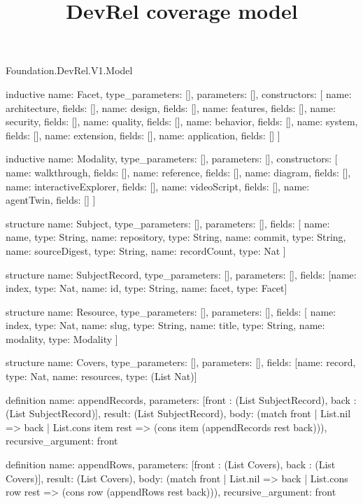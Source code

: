 \begin{lexlean}{Foundation.DevRel.V1.Model}
\title{DevRel coverage model}
\begin{semanticmodule}
inductive{
  name: Facet,
  type_parameters: [],
  parameters: [],
  constructors: [
    {name: architecture, fields: []},
    {name: design, fields: []},
    {name: features, fields: []},
    {name: security, fields: []},
    {name: quality, fields: []},
    {name: behavior, fields: []},
    {name: system, fields: []},
    {name: extension, fields: []},
    {name: application, fields: []}
  ]
}

inductive{
  name: Modality,
  type_parameters: [],
  parameters: [],
  constructors: [
    {name: walkthrough, fields: []},
    {name: reference, fields: []},
    {name: diagram, fields: []},
    {name: interactiveExplorer, fields: []},
    {name: videoScript, fields: []},
    {name: agentTwin, fields: []}
  ]
}

structure{
  name: Subject,
  type_parameters: [],
  parameters: [],
  fields: [
    {name: name, type: String},
    {name: repository, type: String},
    {name: commit, type: String},
    {name: sourceDigest, type: String},
    {name: recordCount, type: Nat}
  ]
}

structure{
  name: SubjectRecord,
  type_parameters: [],
  parameters: [],
  fields: [{name: index, type: Nat}, {name: id, type: String}, {name: facet, type: Facet}]
}

structure{
  name: Resource,
  type_parameters: [],
  parameters: [],
  fields: [
    {name: index, type: Nat},
    {name: slug, type: String},
    {name: title, type: String},
    {name: modality, type: Modality}
  ]
}

structure{
  name: Covers,
  type_parameters: [],
  parameters: [],
  fields: [{name: record, type: Nat}, {name: resources, type: (List Nat)}]
}

definition{
  name: appendRecords,
  parameters: [front : (List SubjectRecord), back : (List SubjectRecord)],
  result: (List SubjectRecord),
  body: (match front
    | List.nil => back
    | List.cons item rest => (cons item (appendRecords rest back))),
  recursive_argument: front
}

definition{
  name: appendRows,
  parameters: [front : (List Covers), back : (List Covers)],
  result: (List Covers),
  body: (match front | List.nil => back | List.cons row rest => (cons row (appendRows rest back))),
  recursive_argument: front
}


\end{semanticmodule}
\end{lexlean}
